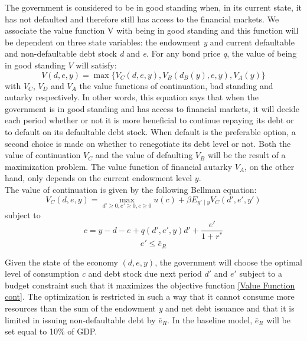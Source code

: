 The government is considered to be in good standing when, in its current state, it has not defaulted and therefore still has access to the financial markets. We associate the value function V with being in good standing and this function will be dependent on three state variables: the endowment \textit{y} and current defaultable and non-defaultable debt stock \textit{d} and \textit{e}. For any bond price \textit{q}, the value of being in good standing $V$ will satisfy: 
\begin{equation}\label{Value Function Good}
    V(d,e,y) = \max\{V_C(d,e,y),V_B(d_B(y),e,y),V_A(y)\}
\end{equation}
with $V_C$, $V_D$ and $V_A$ the value functions of continuation, bad standing and autarky respectively. In other words, this equation says that when the government is in good standing and has access to financial markets, it will decide each period whether or not it is more beneficial to continue repaying its debt or to default on its defaultable debt stock. When default is the preferable option, a second choice is made on whether to renegotiate its debt level or not. Both the value of continuation $V_C$ and the value of defaulting $V_B$ will be the result of a maximization problem. The value function of financial autarky $V_A$, on the other hand, only depends on the current endowment level $y$.\\

The value of continuation is given by the following Bellman equation:
\begin{equation}\label{Value Function cont}
    V_C(d,e,y) = \max_{d'\geq 0,e'\geq 0, c \geq 0} u(c) + \beta E_{y'\mid y} V_C(d',e',y')
\end{equation}
subject to
\begin{equation*}
  c = y - d - e + q(d',e',y)d' + \frac{e'}{1+r^*}
\end{equation*}
\begin{equation*}
    e'\leq \bar{e}_R
\end{equation*}

Given the state of the economy $(d,e,y)$, the government will choose the optimal level of consumption \textit{c} and debt stock due next period $d'$ and $e'$ subject to a budget constraint such that it maximizes the objective function \eqref{Value Function cont}. The optimization is restricted in such a way that it cannot consume more resources than the sum of the endowment \textit{y} and net debt issuance and that it is limited in issuing non-defaultable debt by $\bar{e}_R$. In the baseline model, $\bar{e}_R$ will be set equal to 10\% of GDP.\\

